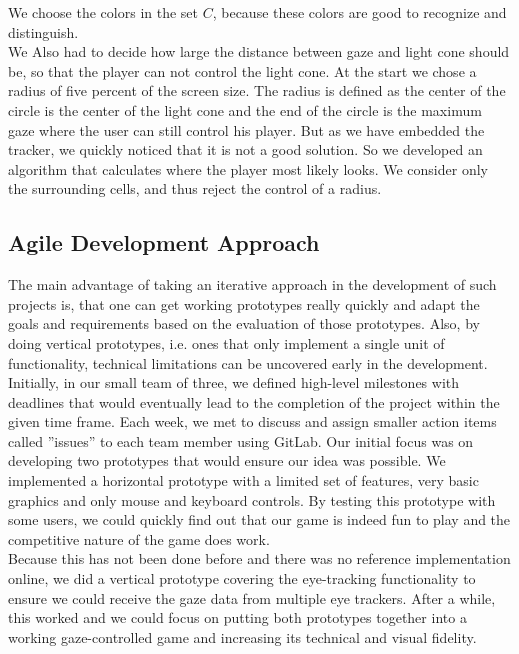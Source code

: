 \documentclass{sigchi}
\begin{document}
We choose the colors in the set $C$, because these colors are good to recognize and distinguish.\\
We Also had to decide how large the distance between gaze and light cone should be, so that the player can not control the light cone. At the start we chose a radius of five percent of the screen size. The radius is defined as the center of the circle is the center of the light cone and the end of the circle is the maximum gaze where the user can still control his player. But as we have embedded the tracker, we quickly noticed that it is not a good solution.
So we developed an algorithm that calculates where the player most likely looks. We consider only the surrounding cells, and thus reject the control of a radius.
\subsection{Agile Development Approach}
The main advantage of taking an iterative approach in the development of such projects is, that one can get working prototypes really quickly and adapt the goals and requirements based on the evaluation of those prototypes. Also, by doing vertical prototypes, i.e. ones that only implement a single unit of functionality, technical limitations can be uncovered early in the development.\\
Initially, in our small team of three, we defined high-level milestones with deadlines that would eventually lead to the completion of the project within the given time frame. Each week, we met to discuss and assign smaller action items called ''issues'' to each team member using GitLab. Our initial focus was on developing two prototypes that would ensure our idea was possible. We implemented a horizontal prototype with a limited set of features, very basic graphics and only mouse and keyboard controls. By testing this prototype with some users, we could quickly find out that our game is indeed fun to play and the competitive nature of the game does work.\\
Because this has not been done before and there was no reference implementation online, we did a vertical prototype covering the eye-tracking functionality to ensure we could receive the gaze data from multiple eye trackers. After a while, this worked and we could focus on putting both prototypes together into a working gaze-controlled game and increasing its technical and visual fidelity.
\end{document}
